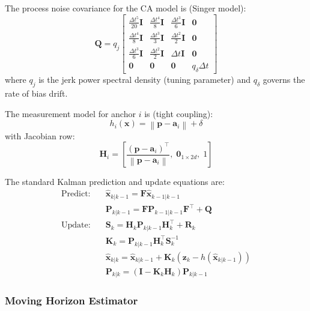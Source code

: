 \documentclass[11pt,a4paper]{article}
\newcommand{\vect}[1]{\bm{#1}}
\newcommand{\mat}[1]{\mathbf{#1}}
\newcommand{\norm}[1]{\left\|#1\right\|}
\newcommand{\Trans}{^{\top}}
\begin{document}
The process noise covariance for the CA model is (Singer model):
\begin{equation}
\mat{Q} = q_j \begin{bmatrix}
\tfrac{\Delta t^5}{20}\mat{I} & \tfrac{\Delta t^4}{8}\mat{I} & \tfrac{\Delta t^3}{6}\mat{I} & \vect{0} \\
\tfrac{\Delta t^4}{8}\mat{I}  & \tfrac{\Delta t^3}{3}\mat{I} & \tfrac{\Delta t^2}{2}\mat{I} & \vect{0} \\
\tfrac{\Delta t^3}{6}\mat{I}  & \tfrac{\Delta t^2}{2}\mat{I} & \Delta t \mat{I}              & \vect{0} \\
\vect{0} & \vect{0} & \vect{0} & q_\delta \Delta t
\end{bmatrix}
\end{equation}
where $q_j$ is the jerk power spectral density (tuning parameter) and $q_\delta$ governs the rate of bias drift.

The measurement model for anchor $i$ is (tight coupling):
\begin{equation}
h_i(\vect{x}) = \norm{\vect{p} - \vect{a}_i} + \delta
\label{eq:measmodel}
\end{equation}
with Jacobian row:
\begin{equation}
\mat{H}_i = \left[\frac{(\vect{p} - \vect{a}_i)\Trans}{\norm{\vect{p} - \vect{a}_i}},\; \vect{0}_{1 \times 2d},\; 1\right]
\end{equation}

The standard Kalman prediction and update equations are:
\begin{align}
\text{Predict:}\quad & \hat{\vect{x}}_{k|k-1} = \mat{F}\hat{\vect{x}}_{k-1|k-1} \\
                     & \mat{P}_{k|k-1} = \mat{F}\mat{P}_{k-1|k-1}\mat{F}\Trans + \mat{Q} \\
\text{Update:}\quad  & \mat{S}_k = \mat{H}_k \mat{P}_{k|k-1} \mat{H}_k\Trans + \mat{R}_k \\
                     & \mat{K}_k = \mat{P}_{k|k-1} \mat{H}_k\Trans \mat{S}_k^{-1} \\
                     & \hat{\vect{x}}_{k|k} = \hat{\vect{x}}_{k|k-1} + \mat{K}_k \left(\vect{z}_k - h(\hat{\vect{x}}_{k|k-1})\right) \\
                     & \mat{P}_{k|k} = (\mat{I} - \mat{K}_k \mat{H}_k)\mat{P}_{k|k-1}
\end{align}

\subsubsection{Moving Horizon Estimator}
\end{document}
